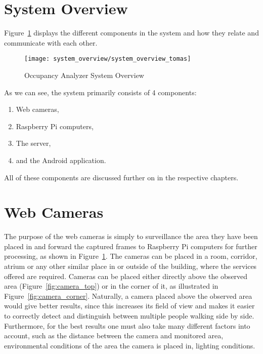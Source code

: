 \section{System Overview}
Figure~\ref{fig:system_overview} displays the different components in the system and how they relate and communicate with each other.
\begin{figure}[ht]
	\centering
	\texttt{[image: system\_overview/system\_overview\_tomas]}
	\caption{Occupancy Analyzer System Overview}
	\label{fig:system_overview}
\end{figure}

As we can see, the system primarily consists of 4 components:

\begin{enumerate}
	\item Web cameras,
	\item Raspberry Pi computers,
	\item The server,
	\item and the Android application.
\end{enumerate}

All of these components are discussed further on in the respective chapters.

\section{Web Cameras}
The purpose of the web cameras is simply to surveillance the area they have been placed in and forward the captured frames to Raspberry Pi computers for further processing, as shown in Figure~\ref{fig:system_overview}. The cameras can be placed in a room, corridor, atrium or any other similar place in or outside of the building, where the services offered are required. Cameras can be placed either directly above the observed area (Figure~\ref{fig:camera_top}) or in the corner of it, as illustrated in Figure~\ref{fig:camera_corner}. Naturally, a camera placed above the observed area would give better results, since this increases its field of view and makes it easier to correctly detect and distinguish between multiple people walking side by side. Furthermore, for the best results one must also take many different factors into account, such as
the distance between the camera and monitored area, environmental conditions of the area the camera is placed in, lighting conditions.

